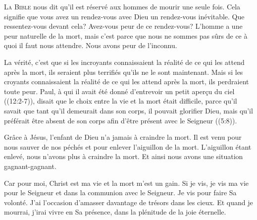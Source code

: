 

\lettrine{L}{a Bible} nous dit
 qu'il est réservé aux hommes de mourir une seule fois.
 Cela signifie que vous avez un rendez-vous avec Dieu
 \ocadr un rendez-vous inévitable. Que ressentez-vous devant cela?
 Avez-vous peur de ce rendez-vous? L'homme a une peur naturelle de la mort,
 mais c'est parce que nous ne sommes pas sûrs de ce à quoi
 il faut nous attendre. Nous avons peur de l'inconnu.


La vérité, c'est que si les incroyants connaissaient la réalité
 de ce qui les attend après la mort, ils seraient plus terrifiés
 qu'ils ne le sont maintenant. Mais si les croyants connaissaient
 la réalité de ce qui les attend après la mort, ils perdraient toute peur.
 Paul, à qui il avait été donné d'entrevoir un petit aper\c{c}u du ciel
 ((12:2-7)), disait que le choix entre la vie et la mort
 était difficile, parce qu'il savait que tant qu'il demeurait dans son corps,
 il pouvait glorifier Dieu, mais qu'il préférait être absent de son corps
 afin d'être présent avec le Seigneur ((5:8)).

Grâce à Jésus, l'enfant de Dieu n'a jamais à craindre la mort.
 Il est venu pour nous sauver de nos péchés et pour enlever l'aiguillon
 de la mort. L'aiguillon étant enlevé, nous n'avons plus à craindre la mort.
 Et ainsi nous avons une situation gagnant-gagnant.

\Og Car pour moi, Christ est ma vie et la mort m'est un gain. \Fg{}
 Si je vis, je vis ma vie pour le Seigneur et dans la communion
 avec le Seigneur. Je vis pour faire Sa volonté.
 J'ai l'occasion d'amasser davantage de trésors dans les cieux.
 Et quand je mourrai, j'irai vivre en Sa présence,
 dans la plénitude de la joie éternelle.

\dvrule







